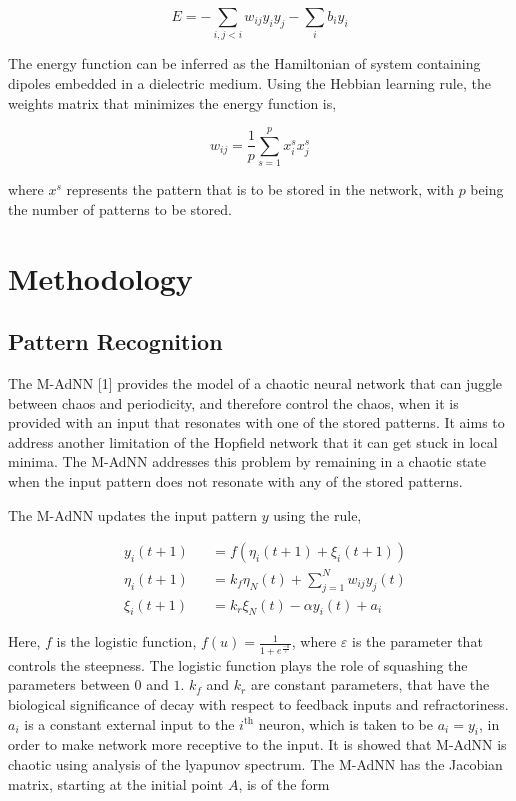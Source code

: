 \documentclass[12pt, letterpaper]{article}
\begin{document}
$$
E = -\sum_{i,j < i} w_{ij}y_i y_j - \sum_{i} b_i y_i
$$

The energy function can be inferred as the Hamiltonian of system containing dipoles embedded in a dielectric medium. Using the Hebbian learning rule, the weights matrix that minimizes the energy function is,

$$
w_{ij} = \frac{1}{p} \sum_{s=1}^p x_i^s x_j^s
$$

where $x^s$ represents the pattern that is to be stored in the network, with $p$ being the number of patterns to be stored.

\section*{Methodology}

\subsection*{Pattern Recognition}

The M-AdNN [1] provides the model of a chaotic neural network that can juggle between chaos and periodicity, and therefore control the chaos, when it is provided with an input that resonates with one of the stored patterns. It aims to address another limitation of the Hopfield network that it can get stuck in local minima. The M-AdNN addresses this problem by remaining in a chaotic state when the input pattern does not resonate with any of the stored patterns.

The M-AdNN updates the input pattern $y$ using the rule,

$$
\begin{aligned}
& y_i(t+1) &&= f(\eta_i(t+1) + \xi_i(t+1))\\
& \eta_i(t+1) &&= k_f \eta_N(t) + \sum_{j = 1}^N w_{ij} y_j(t)\\
& \xi_i(t+1) &&= k_r \xi_N(t) - \alpha y_i(t) + a_i
\end{aligned}
$$

Here, $f$ is the logistic function, $f(u) = \frac{1}{1 + e^\frac{-u}{\varepsilon}}$, where $\varepsilon$ is the parameter that controls the steepness. The logistic function plays the role of squashing the parameters between $0$ and $1$. $k_f$ and $k_r$ are constant parameters, that have the biological significance of decay with respect to feedback inputs and refractoriness. $a_i$ is a constant external input to the $i^{\text{th}}$ neuron, which is taken to be $a_i = y_i$, in order to make network more receptive to the input. It is showed that M-AdNN is chaotic using analysis of the lyapunov spectrum. The M-AdNN has the Jacobian matrix, starting at the initial point $A$, is of the form
\end{document}
